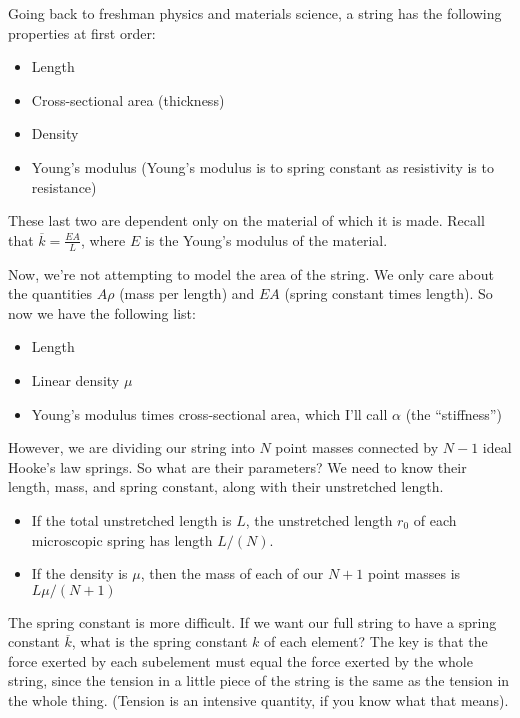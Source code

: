 \documentclass[12ampt]{article}
\begin{document}
Going back to freshman physics and materials science, a string has the following properties at first order:


\begin{itemize}
  \item{Length}
  \item{Cross-sectional area (thickness)}
  \item{Density}
  \item{Young's modulus} (Young's modulus is to spring constant as resistivity is to resistance)
\end{itemize}

These last two are dependent only on the material of which it is made.  Recall that
$\overline k = \frac{EA}{L}$, where $E$ is the Young’s modulus of the material. 

Now, we’re not attempting to model the area of the string.  We only care about the quantities $A \rho$ (mass per length) and
$EA$ (spring constant times length). So now we have the following list:

\begin{itemize}
      \item{Length}
      \item{Linear density $\mu$}
      \item{Young's modulus times cross-sectional area, which I'll call $\alpha$ (the ``stiffness'')}
\end{itemize}



However, we are dividing our string into
$N$ point masses connected by $N-1$ ideal Hooke’s law springs. So what are their
parameters? We need to know their length, mass, and spring constant, along with their unstretched length.

\begin{itemize}
  \item{If the total unstretched length is $L$, the unstretched length $r_0$ of each microscopic spring has length $L/(N)$.}
  \item{If the density is $\mu$, then the mass of each of our $N+1$ point masses is $L \mu / (N+1)$}
     \end{itemize}


     The spring constant is more difficult. If we want our full string to have a spring constant
     $\overline k$, what is the spring constant $k$ of each element? The key is that the force exerted by each
     subelement must equal the force exerted by the whole string, since the tension in a little
     piece of the string is the same as the tension in the whole thing. (Tension is an intensive
     quantity, if you know what that means).
\end{document}
